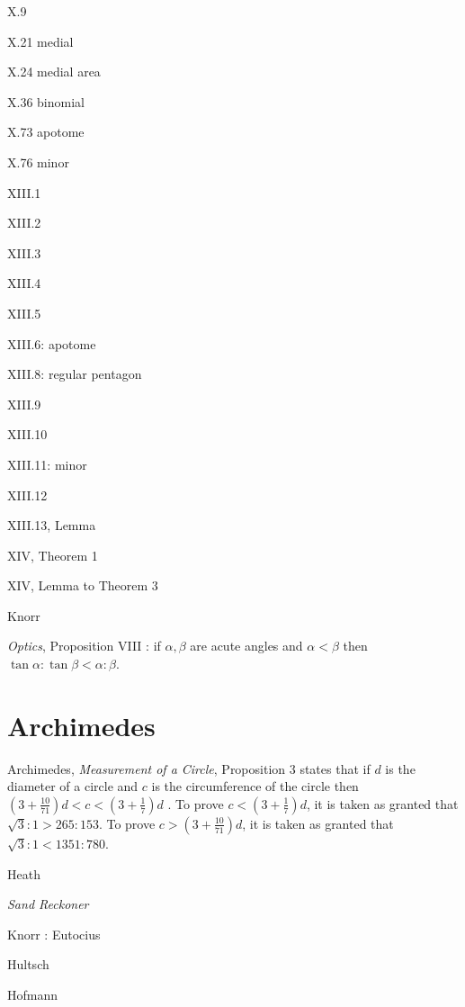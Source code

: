 \documentclass{amsart}
\theoremstyle{definition}
\begin{document}
X.9

X.21 medial

X.24 medial area

X.36 binomial

X.73 apotome

X.76 minor

XIII.1

XIII.2

XIII.3

XIII.4

XIII.5

XIII.6: apotome

XIII.8: regular pentagon

XIII.9

XIII.10

XIII.11: minor

XIII.12

XIII.13, Lemma 

XIV, Theorem 1

XIV, Lemma to Theorem 3





Knorr \cite{knorr1975}

{\em Optics}, Proposition VIII \cite[pp.~260--261]{drabkin}: if $\alpha,\beta$ are acute angles
and $\alpha<\beta$ then $\tan \alpha:\tan \beta<\alpha:\beta$.









\section{Archimedes}
Archimedes, {\em Measurement of a Circle}, Proposition 3 states that 
if $d$ is the diameter of a circle and $c$ is the circumference of the circle then
$\left(3+\frac{10}{71}\right) d < c < \left(3+\frac{1}{7}\right)d$ \cite[pp.~223--238]{dijksterhuis}.
To prove $c<\left(3+\frac{1}{7}\right)d$, 
it is taken as granted that $\sqrt{3}:1>265:153$.
To prove $c>\left(3+\frac{10}{71}\right)d$, it is taken as granted that
$\sqrt{3}:1<1351:780$. 

Heath \cite{archimedes}

{\em Sand Reckoner}

Knorr \cite[p.~522]{knorr1989}: Eutocius  

Hultsch \cite{naherungswerte}

Hofmann \cite{hofmann}
\end{document}
